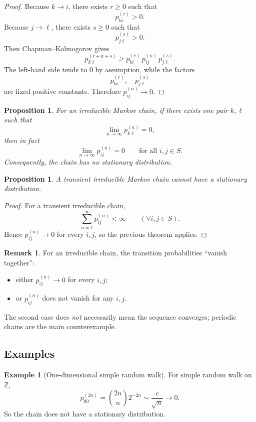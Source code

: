 \documentclass[11pt]{article}
\newtheorem{proposition}[theorem]{Proposition}
\theoremstyle{definition}
\newtheorem{example}[theorem]{Example}
\newtheorem{remark}[theorem]{Remark}
\begin{document}
\begin{proof}
Because \(k\to i\), there exists \(r\ge 0\) such that
\[
p_{ki}^{(r)}>0.
\]
Because \(j\to \ell\), there exists \(s\ge 0\) such that
\[
p_{j\ell}^{(s)}>0.
\]
Then Chapman--Kolmogorov gives
\[
p_{k\ell}^{(r+n+s)}
\ge
p_{ki}^{(r)}\,p_{ij}^{(n)}\,p_{j\ell}^{(s)}.
\]
The left-hand side tends to \(0\) by assumption, while the factors
\[
p_{ki}^{(r)},\quad p_{j\ell}^{(s)}
\]
are fixed positive constants. Therefore \(p_{ij}^{(n)}\to 0\).
\end{proof}

\begin{proposition}
For an irreducible Markov chain, if there exists one pair \(k,\ell\) such that
\[
\lim_{n\to\infty} p_{k\ell}^{(n)}=0,
\]
then in fact
\[
\lim_{n\to\infty} p_{ij}^{(n)}=0
\qquad \text{for all } i,j\in S.
\]
Consequently, the chain has no stationary distribution.
\end{proposition}

\begin{proposition}
A transient irreducible Markov chain cannot have a stationary distribution.
\end{proposition}

\begin{proof}
For a transient irreducible chain,
\[
\sum_{n=1}^{\infty} p_{ij}^{(n)}<\infty
\qquad (\forall i,j\in S).
\]
Hence \(p_{ij}^{(n)}\to 0\) for every \(i,j\), so the previous theorem applies.
\end{proof}

\begin{remark}
For an irreducible chain, the transition probabilities ``vanish together'':
\begin{itemize}[leftmargin=2em]
    \item either \(p_{ij}^{(n)}\to 0\) for every \(i,j\);
    \item or \(p_{ij}^{(n)}\) does not vanish for any \(i,j\).
\end{itemize}
The second case does \emph{not} necessarily mean the sequence converges; periodic chains are the main counterexample.
\end{remark}

\subsection{Examples}

\begin{example}[One-dimensional simple random walk]
For simple random walk on \(\mathbb Z\),
\[
p_{00}^{(2n)}
=
\binom{2n}{n}2^{-2n}
\sim
\frac{c}{\sqrt{n}}
\to 0.
\]
So the chain does not have a stationary distribution.
\end{example}
\end{document}
